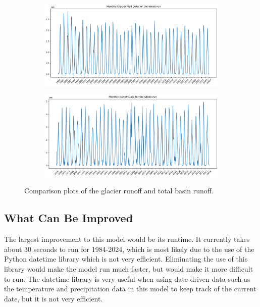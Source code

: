 \documentclass{article}
\begin{document}
\begin{figure}[h]
    \centering
    \begin{subfigure}[b]{\textwidth}
        \centering
        \includegraphics[width=\textwidth]{Plots/glacier_runoff.png}
        \label{fig:glacier_runoff}
    \end{subfigure}
    \hfill
    \begin{subfigure}[b]{\textwidth}
        \centering
        \includegraphics[width=\textwidth]{Plots/all_runoff.png}
        \label{fig:all_runoff}
    \end{subfigure}
    \caption{Comparison plots of the glacier runoff and total basin runoff.}
    \label{fig:runoff_compare}
\end{figure}
\FloatBarrier

\subsection{What Can Be Improved}
The largest improvement to this model would be its runtime. It currently takes about 30 seconds to run for 1984-2024, which is most likely 
due to the use of the Python datetime library which is not very efficient. Eliminating the use of this library would make the model run 
much faster, but would make it more difficult to run. The datetime library is very useful when using date driven data such as the temperature 
and precipitation data in this model to keep track of the current date, but it is not very efficient.
\end{document}
